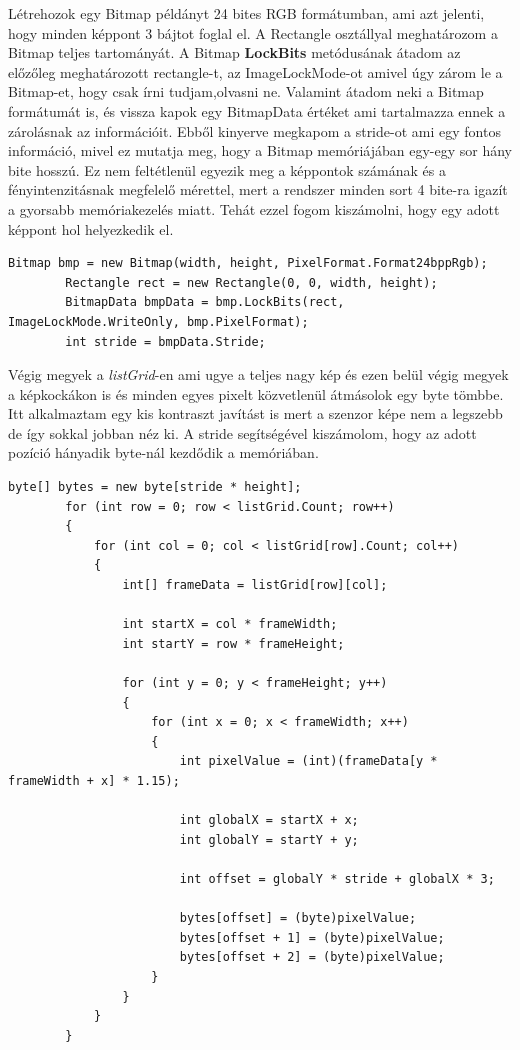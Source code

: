 \documentclass[]{thesis-ekf}
\theoremstyle{definition}
\theoremstyle{remark}
\begin{document}
Létrehozok egy Bitmap példányt 24 bites RGB formátumban, ami azt jelenti, hogy minden képpont 3 bájtot foglal el. A Rectangle\cite{rectangle} osztállyal meghatározom a Bitmap teljes tartományát. A Bitmap \textbf{LockBits} metódusának átadom az előzőleg meghatározott rectangle-t, az ImageLockMode-ot amivel úgy zárom le a Bitmap-et, hogy csak írni tudjam,olvasni ne. Valamint átadom neki a Bitmap formátumát is, és vissza kapok egy BitmapData értéket ami tartalmazza ennek a zárolásnak az információit. Ebből kinyerve megkapom a stride-ot ami egy fontos információ, mivel ez mutatja meg, hogy a Bitmap memóriájában egy-egy sor hány bite hosszú. Ez nem feltétlenül egyezik meg a képpontok számának és a fényintenzitásnak megfelelő mérettel, mert a rendszer minden sort 4 bite-ra igazít a gyorsabb memóriakezelés miatt. Tehát ezzel fogom kiszámolni, hogy egy adott képpont hol helyezkedik el.
\begin{lstlisting}[language=CSharp]	 	
	 	Bitmap bmp = new Bitmap(width, height, PixelFormat.Format24bppRgb);
	 	Rectangle rect = new Rectangle(0, 0, width, height);
	 	BitmapData bmpData = bmp.LockBits(rect, ImageLockMode.WriteOnly, bmp.PixelFormat);	 	
	 	int stride = bmpData.Stride;
\end{lstlisting}
Végig megyek a \emph{listGrid}-en ami ugye a teljes nagy kép és ezen belül végig megyek a képkockákon is és minden egyes pixelt közvetlenül átmásolok egy byte tömbbe. Itt alkalmaztam egy kis kontraszt javítást is mert a szenzor képe nem a legszebb de így sokkal jobban néz ki. A stride segítségével kiszámolom, hogy az adott pozíció hányadik byte-nál kezdődik a memóriában.
\begin{lstlisting}[language=CSharp]	
		byte[] bytes = new byte[stride * height];
	 	for (int row = 0; row < listGrid.Count; row++)
	 	{
	 		for (int col = 0; col < listGrid[row].Count; col++)
	 		{
	 			int[] frameData = listGrid[row][col];
	 		
	 			int startX = col * frameWidth;
	 			int startY = row * frameHeight;
	 		
	 			for (int y = 0; y < frameHeight; y++)
	 			{
	 				for (int x = 0; x < frameWidth; x++)
	 				{
	 					int pixelValue = (int)(frameData[y * frameWidth + x] * 1.15); 
	 				
	 					int globalX = startX + x;
	 					int globalY = startY + y;
	 				
	 					int offset = globalY * stride + globalX * 3;
	 				
	 					bytes[offset] = (byte)pixelValue;       
	 					bytes[offset + 1] = (byte)pixelValue;   
	 					bytes[offset + 2] = (byte)pixelValue;     
	 				}
	 			}
	 		}
	 	}
\end{lstlisting}
\end{document}
